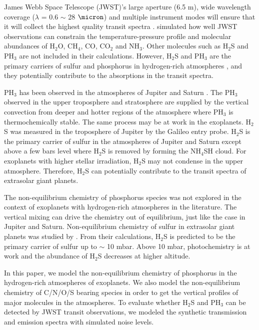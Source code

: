 \documentclass[twocolumn]{aastex61}
\begin{document}
James Webb Space Telescope (JWST)'s large aperture (6.5 m), wide wavelength coverage ($\lambda$ = 0.6 $\sim$ 28 $\micron$) and multiple instrument modes will ensure that it will collect the highest quality transit spectra \citep[e.g.,][]{Beichman14}. \citet{Greene16} simulated how well JWST observations can constrain the temperature-pressure profile and molecular abundances of H$_2$O, CH$_4$, CO, CO$_2$ and NH$_3$. Other molecules such as H$_2$S and PH$_3$ are not included in their calculations. However, H$_2$S and PH$_3$ are the primary carriers of sulfur and phosphorus in hydrogen-rich atmospheres \citep[e.g.,][]{Visscher06}, and they potentially contribute to the absorptions in the transit spectra. 

PH$_3$ has been observed in the atmospheres of Jupiter and Saturn \citep[e.g.][and references therein]{Fletcher09a}. The PH$_3$ observed in the upper troposphere and stratosphere are supplied by the vertical convection from deeper and hotter regions of the atmosphere where PH$_3$ is thermochemically stable. The same process may be at work in the exoplanets. H$_2$S was measured in the troposphere of Jupiter by the Galileo entry probe\citep{Irwin98,Wong04}. H$_2$S is the primary carrier of sulfur in the atmospheres of Jupiter and Saturn except above a few bars level where H$_2$S is removed by forming the NH$_4$SH cloud. For exoplanets with higher stellar irradiation, H$_2$S may not condense in the upper atmosphere. Therefore, H$_2$S can potentially contribute to the transit spectra of extrasolar giant planets.  

The non-equilibrium chemistry of phosphorus species was not explored in the context of exoplanets with hydrogen-rich atmospheres in the literature. The vertical mixing can drive the chemistry out of  equilibrium, just like the case in Jupiter and Saturn. Non-equilibrium chemistry of sulfur in extrasolar giant planets was studied by \citet{Zahnle09b}. From their calculations, H$_2$S is predicted to be the primary carrier of sulfur up to $\sim$ 10 mbar. Above 10 mbar, photochemistry is at work and the abundance of H$_2$S decreases at higher altitude.       

In this paper, we model the non-equilibrium chemistry of phosphorus in the hydrogen-rich atmospheres of exoplanets. We also model the non-equilibrium chemistry of C/N/O/S bearing species in order to get the vertical profiles of major molecules in the atmospheres. To evaluate whether H$_2$S and PH$_3$ can be detected by JWST transit observations, we modeled the synthetic transmission and emission spectra with simulated noise levels. 
\end{document}
